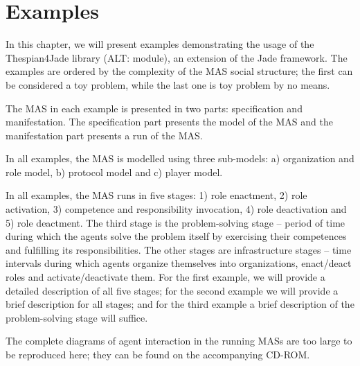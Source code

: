 
\chapter{Examples}

In this chapter, we will present examples demonstrating the usage of the Thespian4Jade library (ALT: module), an extension of the Jade framework.
The examples are ordered by the complexity of the MAS social structure; the first can be considered a toy problem, while the last one is toy problem by no means.

The MAS in each example is presented in two parts: specification and manifestation.
The specification part presents the model of the MAS and the manifestation part presents a run of the MAS.

In all examples, the MAS is modelled using three sub-models: a) organization and role model, b) protocol model and c) player model.

In all examples, the MAS runs in five stages: 1) role enactment, 2) role activation, 3) competence and responsibility invocation, 4) role deactivation and 5) role deactment.
The third stage is the problem-solving stage -- period of time during which the agents solve the problem itself by exercising their competences and fulfilling its responsibilities.
The other stages are infrastructure stages -- time intervals during which agents organize themselves into organizations, enact/deact roles and activate/deactivate them.
For the first example, we will provide a detailed description of all five stages; for the second example we will provide a brief description for all stages; and for the third example a brief description of the problem-solving stage will suffice.

The complete diagrams of agent interaction in the running MASs are too large to be reproduced here; they can be found on the accompanying CD-ROM. 





